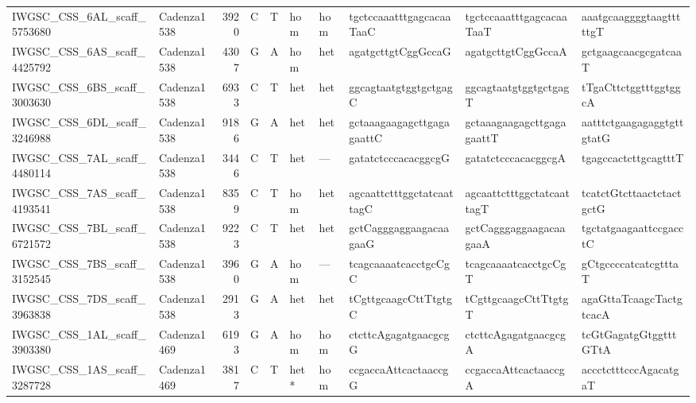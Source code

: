 \begin{tabular}{llrlllllll}
 IWGSC\_CSS\_6AL\_scaff\_5753680  & Cadenza1538 &       3920 & C         & T        & hom            & hom         & tgctccaaatttgagcacaaTaaC  & tgctccaaatttgagcacaaTaaT  & aaatgcaaggggtaagtttttgT   \\
 IWGSC\_CSS\_6AS\_scaff\_4425792  & Cadenza1538 &       4307 & G         & A        & hom            & het         & agatgcttgtCggGccaG        & agatgcttgtCggGccaA        & gctgaagcaacgcgatcaaT      \\
 IWGSC\_CSS\_6BS\_scaff\_3003630  & Cadenza1538 &       6933 & C         & T        & het            & het         & ggcagtaatgtggtgctgagC     & ggcagtaatgtggtgctgagT     & tTgaCttctggtttggtggcA     \\
 IWGSC\_CSS\_6DL\_scaff\_3246988  & Cadenza1538 &       9186 & G         & A        & het            & het         & gctaaagaagagcttgagagaattC & gctaaagaagagcttgagagaattT & aatttctgaagagaggtgttgtatG \\
 IWGSC\_CSS\_7AL\_scaff\_4480114  & Cadenza1538 &       3446 & C         & T        & het            & ---         & gatatctcccacacggcgG       & gatatctcccacacggcgA       & tgagccactcttgcagtttT      \\
 IWGSC\_CSS\_7AS\_scaff\_4193541  & Cadenza1538 &       8359 & C         & T        & hom            & het         & agcaattctttggctatcaattagC & agcaattctttggctatcaattagT & tcatctGtcttaactctactgctG  \\
 IWGSC\_CSS\_7BL\_scaff\_6721572  & Cadenza1538 &       9223 & C         & T        & het            & het         & gctCagggaggaagacaagaaG    & gctCagggaggaagacaagaaA    & tgctatgaagaattccgacctC    \\
 IWGSC\_CSS\_7BS\_scaff\_3152545  & Cadenza1538 &       3960 & G         & A        & hom            & ---         & tcagcaaaatcacctgcCgC      & tcagcaaaatcacctgcCgT      & gCtgccccatcatcgtttaT      \\
 IWGSC\_CSS\_7DS\_scaff\_3963838  & Cadenza1538 &       2913 & G         & A        & het            & het         & tCgttgcaagcCttTtgtgC      & tCgttgcaagcCttTtgtgT      & agaGttaTcaagcTactgtcacA   \\
 IWGSC\_CSS\_1AL\_scaff\_3903380  & Cadenza1469 &       6193 & G         & A        & hom            & hom         & ctcttcAgagatgaacgcgG      & ctcttcAgagatgaacgcgA      & tcGtGagatgGtggtttGTtA     \\
 IWGSC\_CSS\_1AS\_scaff\_3287728  & Cadenza1469 &       3817 & C         & T        & het*           & hom         & ccgaccaAttcactaaccgG      & ccgaccaAttcactaaccgA      & accctctttcccAgacatgaT     \\

\end{tabular}
